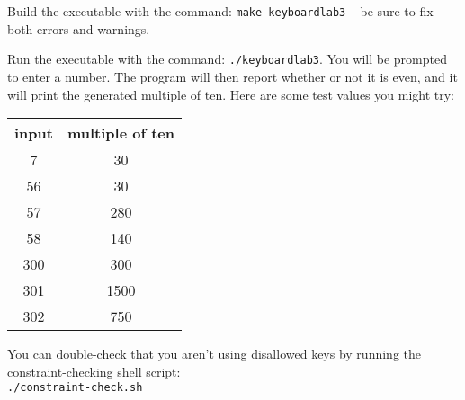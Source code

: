 Build the executable with the command: \texttt{make keyboardlab3} -- be sure to fix both errors and warnings.

Run the executable with the command: \texttt{./keyboardlab3}.
You will be prompted to enter a number.
The program will then report whether or not it is even, and it will print the generated multiple of ten.
Here are some test values you might try:

\begin{center}
    \begin{tabular}{cc}
        input   & multiple of ten \\ \hline
        7       & 30    \\
        56      & 30    \\
        57      & 280   \\
        58      & 140   \\
        300     & 300   \\
        301     & 1500  \\
        302     & 750   \\
    \end{tabular}
\end{center}

You can double-check that you aren't using disallowed keys by running the constraint-checking shell script: \\
\texttt{./constraint-check.sh} \\
